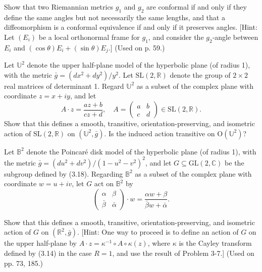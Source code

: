 \begin{exercise}\label{prob:conformal-metrics}
Show that two Riemannian metrics $g_1$ and $g_2$ are conformal if and only if they define the same angles but not necessarily the same lengths, and that a diffeomorphism is a conformal equivalence if and only if it preserves angles. [Hint: Let $(E_i)$ be a local orthonormal frame for $g_1$, and consider the $g_2$-angle between $E_i$ and $(\cos\theta)E_i + (\sin\theta)E_j$.] (Used on p. 59.)
\end{exercise}

\begin{exercise}\label{prob:sl2r-upper-half-plane}
Let $\mathbb{U}^2$ denote the upper half-plane model of the hyperbolic plane (of radius 1), with the metric $\bar{g} = (dx^2 + dy^2)/y^2$. Let $\text{SL}(2,\mathbb{R})$ denote the group of $2 \times 2$ real matrices of determinant 1. Regard $\mathbb{U}^2$ as a subset of the complex plane with coordinate $z = x + iy$, and let
\[
A \cdot z = \frac{az + b}{cz + d}, \quad A = \begin{pmatrix} a & b \\ c & d \end{pmatrix} \in \text{SL}(2,\mathbb{R}).
\]
Show that this defines a smooth, transitive, orientation-preserving, and isometric action of $\text{SL}(2,\mathbb{R})$ on $(\mathbb{U}^2,\bar{g})$. Is the induced action transitive on $\text{O}(\mathbb{U}^2)$?
\end{exercise}

\begin{exercise}\label{prob:poincare-disk}
Let $\mathbb{B}^2$ denote the Poincaré disk model of the hyperbolic plane (of radius 1), with the metric $\bar{g} = (du^2 + dv^2)/(1-u^2-v^2)^2$, and let $G \subseteq \text{GL}(2,\mathbb{C})$ be the subgroup defined by (3.18). Regarding $\mathbb{B}^2$ as a subset of the complex plane with coordinate $w = u + iv$, let $G$ act on $\mathbb{B}^2$ by
\[
\begin{pmatrix} \alpha & \beta \\ \bar{\beta} & \bar{\alpha} \end{pmatrix} \cdot w = \frac{\alpha w + \beta}{\bar{\beta}w + \bar{\alpha}}.
\]

Show that this defines a smooth, transitive, orientation-preserving, and isometric action of $G$ on $(\mathbb{R}^2, \bar{g})$. [Hint: One way to proceed is to define an action of $G$ on the upper half-plane by $A \cdot z = \kappa^{-1} \circ A \circ \kappa(z)$, where $\kappa$ is the Cayley transform defined by (3.14) in the case $R = 1$, and use the result of Problem 3-7.] (Used on pp. 73, 185.)
\end{exercise}

